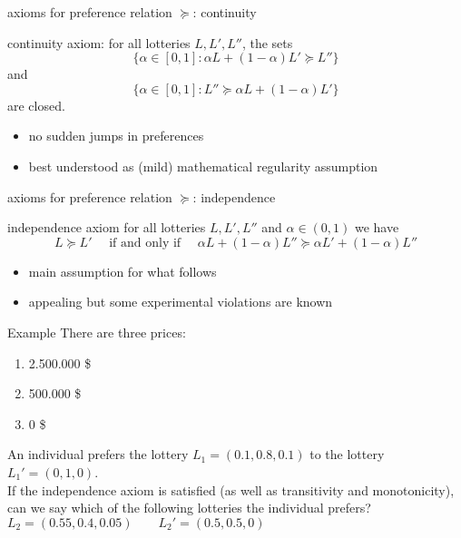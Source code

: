 \documentclass[bigger]{beamer}
\begin{document}
\begin{frame}[label={sec:org8596f48}]{axioms for preference relation \(\succeq\): continuity}
\begin{block}{continuity axiom:}
    for all lotteries \(L,L',L''\), the sets
$$ \{\alpha\in[0,1]: \alpha L+(1-\alpha)L'\succeq L''\}$$
and
$$\{\alpha\in[0,1]: L''\succeq \alpha L+(1-\alpha) L'\}$$
are closed.
\end{block}

\begin{itemize}
\item no sudden jumps in preferences
\item best understood as (mild) mathematical regularity assumption
\end{itemize}
\end{frame}

\begin{frame}[label={sec:orge0b955c}]{axioms for preference relation \(\succeq\): independence}
\begin{block}{independence axiom}
for all lotteries \(L,L',L''\) and \(\alpha\in(0,1)\) we have
$$L\succeq L' \quad\text{ if and only if }\quad \alpha L+(1-\alpha) L''\succeq \alpha L'+(1-\alpha) L''$$
\end{block}

\begin{itemize}
\item main assumption for what follows
\item appealing but some experimental violations are known
\end{itemize}
\end{frame}

\begin{frame}[label={sec:org2348d12}]{Example}
There are three prices:
\begin{enumerate}
\item 2.500.000 \$
\item 500.000 \$
\item 0 \$
\end{enumerate}
An individual prefers the lottery \(L_1=(0.1,0.8,0.1)\) to the lottery \(L_1'=(0,1,0)\).\\
If the independence axiom is satisfied (as well as transitivity and monotonicity), can we say which of the following lotteries the individual prefers?\\
\(L_2=(0.55,0.4,0.05)\qquad L_2'=(0.5,0.5,0)\)
\end{frame}
\end{document}

